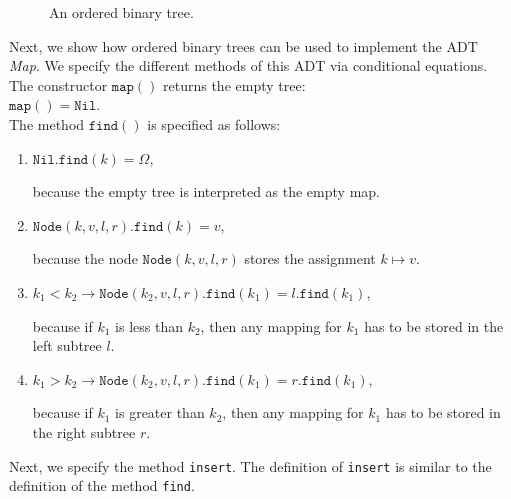 \begin{figure}[!ht]
  \centering
  \caption{An ordered binary tree.}
  \label{fig:graph1}
\end{figure}


Next, we show how ordered binary trees can be used to implement the ADT  \textsl{Map}.  We specify
the different methods of this ADT via conditional equations.  The constructor $\texttt{map}()$
returns the empty tree:
\\[0.2cm]
\hspace*{1.3cm}
$\texttt{map}() = \texttt{Nil}$. 
\\[0.2cm]
The  method $\texttt{find}()$ is specified as follows:
\begin{enumerate}
\item $\texttt{Nil}.\texttt{find}(k) = \Omega$,

      because the empty tree is interpreted as the empty map.
\item $\texttt{Node}(k, v, l, r).\texttt{find}(k) = v$,

      because the node $\texttt{Node}(k,v,l,r)$ stores the assignment $k \mapsto v$.
\item $k_1 < k_2 \rightarrow \texttt{Node}(k_2, v, l, r).\texttt{find}(k_1) = l.\texttt{find}(k_1)$,

      because if $k_1$ is less than $k_2$, then any mapping for $k_1$ has to be stored in the left
      subtree  $l$.
\item $k_1 > k_2 \rightarrow \texttt{Node}(k_2, v, l, r).\texttt{find}(k_1) = r.\texttt{find}(k_1)$,

      because if $k_1$ is greater than $k_2$, then any mapping for $k_1$ has to be stored in the right
      subtree  $r$.
\end{enumerate}
Next, we specify the method  \texttt{insert}.  The definition of \texttt{insert} is similar to the
definition of the method  \texttt{find}.
